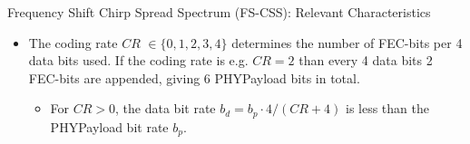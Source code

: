 \begin{frame}{\alert{Frequency Shift} Chirp Spread Spectrum (FS-CSS): Relevant Characteristics}
\begin{itemize}
    \item The \alert{coding rate $CR$} $\in \{0, 1, 2, 3, 4\}$ determines the number of \alert{FEC-bits} per \alert{4 data bits} used. If the coding rate is e.g. $CR = 2$ than every \textcolor{fh-ooe-red}{4} \alert{data bits} \textcolor{fh-ooe-red}{2} \alert{FEC-bits} are appended, giving \textcolor{fh-ooe-red}{6} \alert{PHYPayload bits} in total.
    \begin{itemize}
      \item[$\Rightarrow$] For $CR > 0$, the \alert{data bit rate} $b_d  = b_p \cdot 4 / (CR + 4)$ is less than the \alert{PHYPayload bit rate $b_p$}.
    \end{itemize}
  \end{itemize}
\end{frame}
